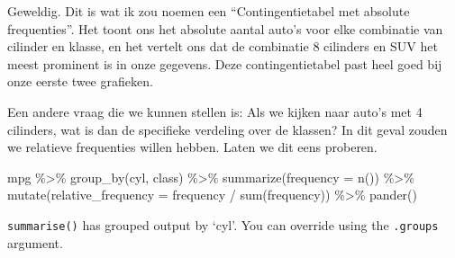 \documentclass[]{tufte-book}
\newenvironment{Shaded}{}{}
\newcommand{\AttributeTok}[1]{\textcolor[rgb]{0.49,0.56,0.16}{#1}}
\newcommand{\FunctionTok}[1]{\textcolor[rgb]{0.02,0.16,0.49}{#1}}
\newcommand{\NormalTok}[1]{#1}
\newcommand{\SpecialCharTok}[1]{\textcolor[rgb]{0.25,0.44,0.63}{#1}}
\begin{document}
Geweldig. Dit is wat ik zou noemen een ``Contingentietabel met absolute frequenties''. Het toont ons het absolute aantal auto's voor elke combinatie van cilinder en klasse, en het vertelt ons dat de combinatie 8 cilinders en SUV het meest prominent is in onze gegevens. Deze contingentietabel past heel goed bij onze eerste twee grafieken.

Een andere vraag die we kunnen stellen is: Als we kijken naar auto's met 4 cilinders, wat is dan de specifieke verdeling over de klassen? In dit geval zouden we relatieve frequenties willen hebben. Laten we dit eens proberen.

\begin{Shaded}
\begin{Highlighting}[]
\NormalTok{mpg }\SpecialCharTok{\%\textgreater{}\%}
  \FunctionTok{group\_by}\NormalTok{(cyl, class) }\SpecialCharTok{\%\textgreater{}\%}
  \FunctionTok{summarize}\NormalTok{(}\AttributeTok{frequency =} \FunctionTok{n}\NormalTok{()) }\SpecialCharTok{\%\textgreater{}\%}
  \FunctionTok{mutate}\NormalTok{(}\AttributeTok{relative\_frequency =}\NormalTok{ frequency }\SpecialCharTok{/} \FunctionTok{sum}\NormalTok{(frequency)) }\SpecialCharTok{\%\textgreater{}\%}
  \FunctionTok{pander}\NormalTok{()}
\end{Highlighting}
\end{Shaded}

\texttt{summarise()} has grouped output by `cyl'. You can override using the \texttt{.groups} argument.
\end{document}
